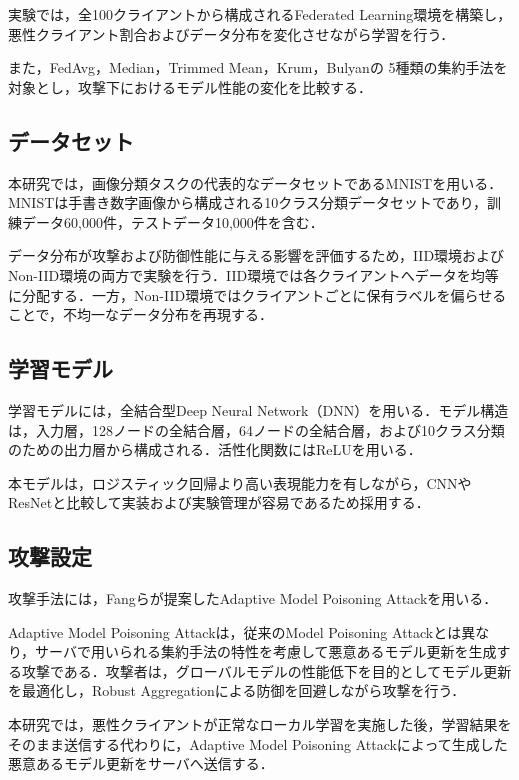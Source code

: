 \documentclass[a4j, twocolumn, dvipdfmx]{jsarticle}  %
\begin{document}
実験では，全100クライアントから構成されるFederated Learning環境を構築し，悪性クライアント割合およびデータ分布を変化させながら学習を行う．

また，FedAvg，Median，Trimmed Mean，Krum，Bulyanの
5種類の集約手法を対象とし，攻撃下におけるモデル性能の変化を比較する．

\subsection{データセット}

本研究では，画像分類タスクの代表的なデータセットであるMNISTを用いる．MNISTは手書き数字画像から構成される10クラス分類データセットであり，訓練データ60,000件，テストデータ10,000件を含む．

データ分布が攻撃および防御性能に与える影響を評価するため，IID環境およびNon-IID環境の両方で実験を行う．IID環境では各クライアントへデータを均等に分配する．一方，Non-IID環境ではクライアントごとに保有ラベルを偏らせることで，不均一なデータ分布を再現する．

\subsection{学習モデル}

学習モデルには，全結合型Deep Neural Network（DNN）を用いる．モデル構造は，入力層，128ノードの全結合層，64ノードの全結合層，および10クラス分類のための出力層から構成される．活性化関数にはReLUを用いる．

本モデルは，ロジスティック回帰より高い表現能力を有しながら，CNNやResNetと比較して実装および実験管理が容易であるため採用する．

\subsection{攻撃設定}

攻撃手法には，Fangらが提案したAdaptive Model Poisoning Attackを用いる．

Adaptive Model Poisoning Attackは，従来のModel Poisoning Attackとは異なり，サーバで用いられる集約手法の特性を考慮して悪意あるモデル更新を生成する攻撃である．攻撃者は，グローバルモデルの性能低下を目的としてモデル更新を最適化し，Robust Aggregationによる防御を回避しながら攻撃を行う．

本研究では，悪性クライアントが正常なローカル学習を実施した後，学習結果をそのまま送信する代わりに，Adaptive Model Poisoning Attackによって生成した悪意あるモデル更新をサーバへ送信する．
\end{document}
